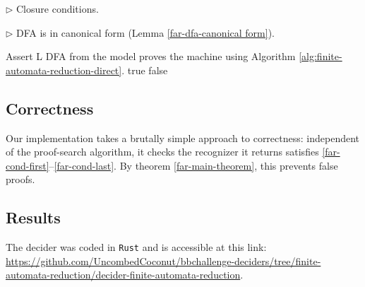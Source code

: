 \begin{algorithm}
\begin{algorithmic}[1]
    \State \(\triangleright\) Closure conditions.
    \State{}
    \EndFor
    \State{}
    \EndFor
    \State{}
    \EndFor

    \State \(\triangleright\) DFA is in canonical form (Lemma \ref{far-dfa-canonical form}).
    \State{}
    \State{}
    \State{}
    \EndFor
    \EndFor

    \State Assert L DFA from the model proves the machine using Algorithm \ref{alg:finite-automata-reduction-direct}.
    \State \Return true
    \Else\;\Return false
    \EndIf
    \EndProcedure
  \end{algorithmic}
\end{algorithm}


\subsection{Correctness}
Our implementation takes a brutally simple approach to correctness:
independent of the proof-search algorithm, it checks the recognizer it returns satisfies \eqref{far-cond-first}--\eqref{far-cond-last}.
By theorem \ref{far-main-theorem}, this prevents false proofs.


\subsection{Results}
The decider was coded in \texttt{Rust} and is accessible at this link: \url{https://github.com/UncombedCoconut/bbchallenge-deciders/tree/finite-automata-reduction/decider-finite-automata-reduction}.

